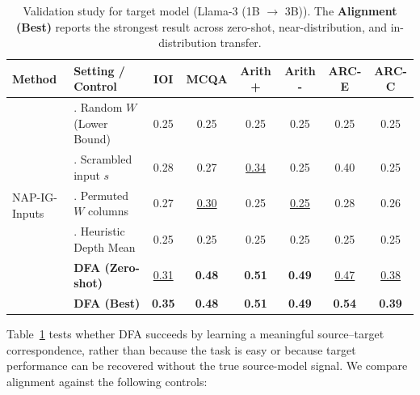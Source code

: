 \documentclass{article} %
\begin{document}
\label{subsec:exp_ablations}









\begin{table}[t]
\centering
\small
\setlength{\tabcolsep}{3pt}
\renewcommand{\arraystretch}{1.05}
\begin{tabular}{l >{\raggedright\arraybackslash}p{4.2cm} cccccc}
\toprule
\textbf{Method} & \textbf{Setting / Control} & \textbf{IOI} & \textbf{MCQA} & \textbf{Arith +} & \textbf{Arith -} & \textbf{ARC-E} & \textbf{ARC-C} \\
\midrule
\multirow{6}{*}{NAP-IG-Inputs} & 1. Random $W$ (Lower Bound) & 0.25 & 0.25 & 0.25 & 0.25 & 0.25 & 0.25 \\
& 2. Scrambled input $s$ & 0.28 & 0.27 & \underline{0.34} & 0.25 & 0.40 & 0.25 \\
& 3. Permuted $W$ columns & 0.27 & \underline{0.30} & 0.25 & \underline{0.25} & 0.28 & 0.26 \\
& 4. Heuristic Depth Mean & 0.25 & 0.25 & 0.25 & 0.25 & 0.25 & 0.25 \\
\addlinespace[4pt]
& \textbf{DFA (Zero-shot)} & \underline{0.31} & \textbf{0.48} & \textbf{0.51} & \textbf{0.49} & \underline{0.47} & \underline{0.38} \\
& \textbf{DFA (Best)} & \textbf{0.35} & \textbf{0.48} & \textbf{0.51} & \textbf{0.49} & \textbf{0.54} & \textbf{0.39} \\
\bottomrule
\end{tabular}

\caption{Validation study for target model (Llama-3 (1B $\to$ 3B)). The  \textbf{Alignment (Best)} reports the strongest result across zero-shot, near-distribution, and in-distribution transfer.}
\label{tab:ablations-summary-llama3-1b-to-llama3-3b}
\end{table}




    
    









Table~\ref{tab:ablations-summary-llama3-1b-to-llama3-3b} tests whether DFA succeeds by learning a meaningful source--target correspondence, rather than because the task is easy or because target performance can be recovered without the true source-model signal. We compare alignment against the following controls:
\end{document}
